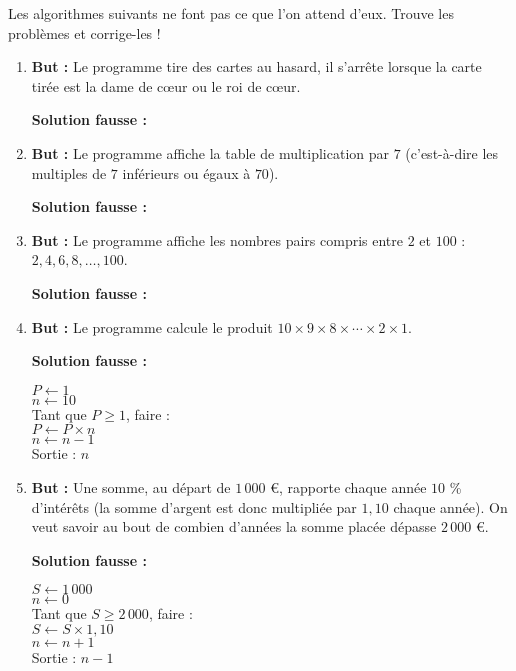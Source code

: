 \documentclass[class=report,crop=false, 12pt]{standalone}
\begin{document}
\begin{activite}
Les algorithmes suivants ne font pas ce que l'on attend d'eux. Trouve les problèmes et corrige-les !

\begin{enumerate}
  \item \textbf{But :} Le programme tire des cartes au hasard, il s'arrête lorsque la carte tirée est la dame de c\oe ur ou le roi de c\oe ur.
    
    \textbf{Solution fausse :}
 
  \item \textbf{But :} Le programme affiche la table de multiplication par $7$ (c'est-à-dire les multiples de $7$ inférieurs ou égaux à $70$).
  
    \textbf{Solution fausse :}  
  
  \item \textbf{But :} Le programme affiche les nombres pairs compris entre $2$ et $100$ : $2,4,6,8,\ldots, 100$.

    \textbf{Solution fausse :}
   
  \item \textbf{But :} Le programme calcule le produit $10 \times 9 \times 8 \times \cdots \times 2 \times 1$.
  
      \textbf{Solution fausse :}
\begin{center}
\begin{minipage}{0.4\textwidth}
$P \leftarrow 1$\\
$n \leftarrow 10$\\
Tant que $P \ge 1$, faire :\\
\indentation $P \leftarrow P \times n$\\
\indentation $n \leftarrow n-1$\\
Sortie : $n$
\end{minipage}
\end{center}    
  
  \item \textbf{But :} Une somme, au départ de $1\, 000$ €, rapporte chaque année $10$ \% d'intérêts (la somme d'argent est donc multipliée par $1,\!10$ chaque année). On veut savoir au bout de combien d'années la somme placée dépasse $2\,000$ €.
  
     \textbf{Solution fausse :} 
\begin{center}
\begin{minipage}{0.4\textwidth}
$S \leftarrow 1\,000$\\
$n \leftarrow 0$\\
Tant que $S \ge 2\,000$, faire :\\
\indentation $S \leftarrow S \times 1,10$\\
\indentation $n \leftarrow n+1$\\
Sortie : $n-1$
\end{minipage}
\end{center}  
  
\end{enumerate}
\end{activite}
\end{document}
